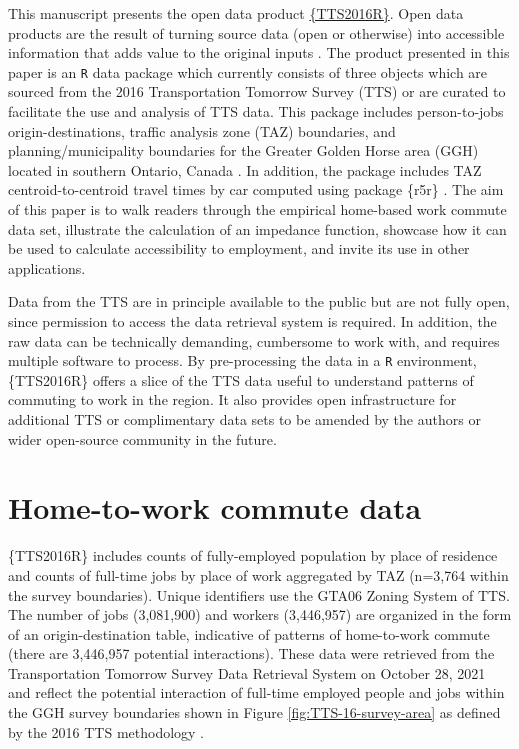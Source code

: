 \documentclass[Royal,times,sageh]{sagej}
\begin{document}
This manuscript presents the open data product
\href{https://github.com/soukhova/TTS2016R}{\{TTS2016R\}}. Open data
products are the result of turning source data (open or otherwise) into
accessible information that adds value to the original inputs
\citep[see][]{Arribas2021open}. The product presented in this paper is
an \texttt{R} data package which currently consists of three objects
which are sourced from the 2016 Transportation Tomorrow Survey (TTS) or
are curated to facilitate the use and analysis of TTS data. This package
includes person-to-jobs origin-destinations, traffic analysis zone (TAZ)
boundaries, and planning/municipality boundaries for the Greater Golden
Horse area (GGH) located in southern Ontario, Canada
\citep{data_management_group_tts_2018}. In addition, the package
includes TAZ centroid-to-centroid travel times by car computed using
package \{r5r\} \citep{Pereira2021r5r}. The aim of this paper is to walk
readers through the empirical home-based work commute data set,
illustrate the calculation of an impedance function, showcase how it can
be used to calculate accessibility to employment, and invite its use in
other applications.

Data from the TTS are in principle available to the public but are not
fully open, since permission to access the data retrieval system is
required. In addition, the raw data can be technically demanding,
cumbersome to work with, and requires multiple software to process. By
pre-processing the data in a \texttt{R} environment, \{TTS2016R\} offers
a slice of the TTS data useful to understand patterns of commuting to
work in the region. It also provides open infrastructure for additional
TTS or complimentary data sets to be amended by the authors or wider
open-source community in the future.

\hypertarget{home-to-work-commute-data}{%
\section{Home-to-work commute data}\label{home-to-work-commute-data}}

\{TTS2016R\} includes counts of fully-employed population by place of
residence and counts of full-time jobs by place of work aggregated by
TAZ (n=3,764 within the survey boundaries). Unique identifiers use the
GTA06 Zoning System of TTS. The number of jobs (3,081,900) and workers
(3,446,957) are organized in the form of an origin-destination table,
indicative of patterns of home-to-work commute (there are 3,446,957
potential interactions). These data were retrieved from the
Transportation Tomorrow Survey Data Retrieval System on October 28, 2021
and reflect the potential interaction of full-time employed people and
jobs within the GGH survey boundaries shown in Figure
\ref{fig:TTS-16-survey-area} as defined by the 2016 TTS methodology
\citep{data_management_group_tts_2018}.
\end{document}
